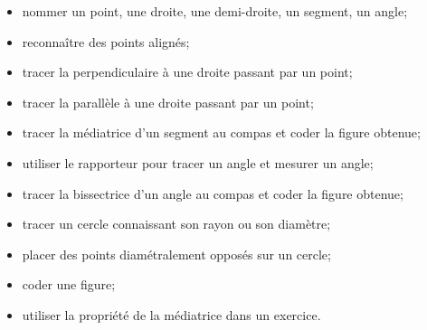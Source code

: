 \begin{acquis}
\begin{itemize}
\item nommer un point, une droite, une demi-droite, un segment, un angle;
\item reconnaître des points alignés;
\item tracer la perpendiculaire à une droite passant par un point;
\item tracer la parallèle à une droite passant par un point;
\item tracer la médiatrice d’un segment au compas et coder la figure obtenue;
\item utiliser le rapporteur pour tracer un angle et mesurer un angle;
\item tracer la bissectrice d’un angle au compas et coder la figure obtenue;
\item tracer un cercle connaissant son rayon ou son diamètre;
\item placer des points diamétralement opposés sur un cercle;
\item coder une figure;
\item utiliser la propriété de la médiatrice dans un exercice.
\end{itemize}
\end{acquis} 


